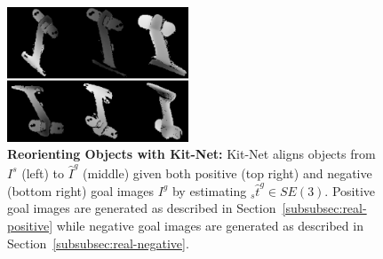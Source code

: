 \begin{figure}
  \centering
  \includegraphics[width=0.48\textwidth]{figures/Orientation.PNG}
  \caption{\textbf{Reorienting Objects with Kit-Net: }Kit-Net aligns objects from $I^s$ (left) to $\hat{I}^g$ (middle) given both positive (top right) and negative (bottom right) goal images $I^g$ by estimating ${_s}\hat{t}^g \in SE(3)$. Positive goal images are generated as described in Section~\ref{subsubsec:real-positive} while negative goal images are generated as described in Section~\ref{subsubsec:real-negative}.}
  \label{fig:Kit-Net-to-cavity}
\end{figure}